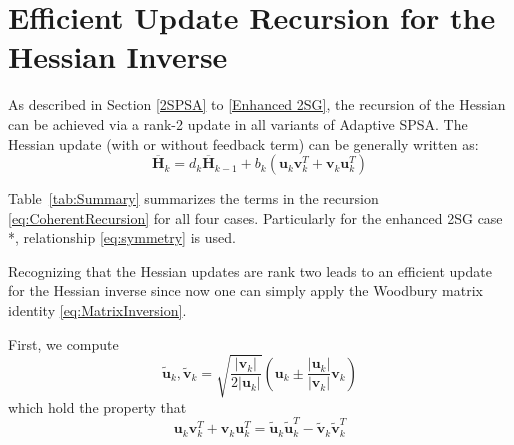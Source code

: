 \documentclass[conference]{IEEEtran}
\newcommand{\bDelta}{\bm{\Delta}}
\newcommand{\oH}{\bm{\overline{H}}}
\newcommand{\remove}[1]{}
\begin{document}
\remove{
We can obtain a rank-2 update from $ \oH_{k-1}^{-1} $ to $ \oH_{k}^{-1} $. The sequential recursion of the $ \oH_k^{-1} $ is as following:
\begin{equation} \label{eq:Enhanced2SGSequentialUpdate}
\begin{dcases}
\bm{B}_k^{-1}
&=\oH_{k-1}^{-1}-\oH_{k-1}^{-1}\bm{b}_k\\
&~~~\cdot(1+\bDelta_k^{-T}\oH_{k-1}^{-1}\bm{b}_k)^{-1}\bDelta_k^{-T}\oH_{k-1}^{-1}\\
\oH_k^{-1}
&=\bm{B}_k^{-1}-\bm{B}_k^{-1}\bDelta_k\\
&~~~\cdot(1+\bm{b}_k^{T}\bm{B}_k^{-1}\bDelta_k)^{-1}\bm{b}_k^{T}\bm{B}_k^{-1}
\end{dcases}
\end{equation}
where
\begin{equation} \label{eq:Enhanced2SGB}
\bm{B}_k=\oH_{k-1}+\bm{b}_k\bDelta_k^{-T}
\end{equation}

Now we analyze the FLOPs of the sequential update \ref{eq:Enhanced2SGSequentialUpdate}, compared with the original algorithm \ref{eq:Enhancement}:
}


\section{Efficient Update Recursion for the Hessian Inverse}
As described in Section \ref{2SPSA} to \ref{Enhanced 2SG}, the
recursion of the Hessian can be achieved via a rank-2 update in all
variants of Adaptive SPSA.
The Hessian update (with or without feedback term) can be
generally written as:
\begin{equation} \label{eq:CoherentRecursion}
\oH_{k}=d_k\oH_{k-1}+b_k(\bm{u}_k \bm{v}_k^{T}+\bm{v}_k \bm{u}_k^{T})
\end{equation}

Table~\ref{tab:Summary} summarizes the terms in the recursion
\ref{eq:CoherentRecursion} for all four cases. Particularly for the enhanced 2SG case *, relationship \ref{eq:symmetry} is used.

Recognizing that the Hessian updates are rank two leads to an
efficient update for the Hessian inverse since now one can simply apply the
Woodbury matrix identity \ref{eq:MatrixInversion}.

First, we compute
\begin{equation}
\bm{\tilde{u}}_k, \bm{\tilde{v}}_k =
\sqrt{\frac{|\bm{v}_k|}{2|\bm{u}_k|}} (\bm{u}_k \pm
\frac{|\bm{u}_k|}{|\bm{v}_k|}\bm{v}_k)
\end{equation}
which hold the property that
\begin{equation*}
\bm{u}_k \bm{v}_k^{T}+\bm{v}_k \bm{u}_k^{T} = \bm{\tilde{u}}_k
\bm{\tilde{u}}_k^{T} - \bm{\tilde{v}}_k \bm{\tilde{v}}_k^{T}
\end{equation*}
\end{document}
